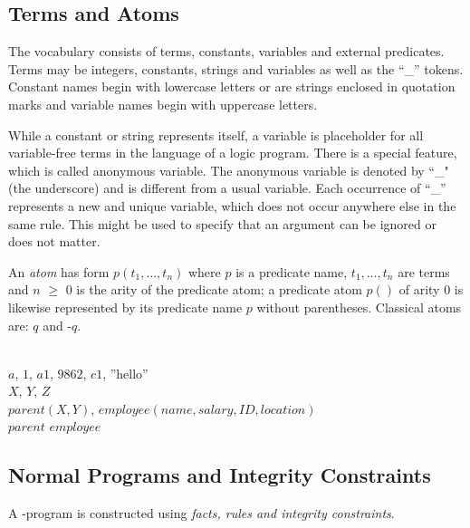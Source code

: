 \documentclass[a4paper, titlepage]{article}
\begin{document}
\subsection{Terms and Atoms}
The vocabulary consists of terms, constants, variables and 
external predicates. Terms may be integers, constants, 
strings and variables as well as the \enquote{\_} tokens. 
Constant names begin with lowercase letters or are strings 
enclosed in quotation marks and variable names begin with 
uppercase letters.

While a constant or string represents itself, a variable is 
placeholder for all variable-free terms in the language of 
a logic program. There is a special feature, which is 
called anonymous variable. The anonymous variable is 
denoted by ``\_" (the underscore) and is different from a 
usual variable. Each occurrence of \enquote{\_} represents 
a new and unique variable, which does not occur anywhere 
else in the same rule. This might be used to specify that 
an argument can be ignored or does not matter.

An \emph{atom} has form $\mathit{p(t_1,\dots,t_n)}$ where 
$p$ is a predicate name, $t_1,\dots,t_n$ are terms and $n$ 
$\geq$ $0$ is the arity of the predicate atom; a predicate 
atom $p()$ of arity 0 is likewise represented by its 
predicate name $p$ without parentheses. Classical atoms 
are: $q$ and -$q$.

\begin{exmp}
\text{   }
\\  $a$, $1$, $\mathit{a1}$, 
$\mathit{9862}$, $\mathit{c1}$, ''hello''
\\  $X$, $Y$, $Z$
\\  $\mathit{parent}(X,Y)$, $\mathit{employee}
(name, salary, ID, location)$
\\  $\mathit{parent}$ $\mathit{employee}$
\end{exmp}
\subsection{Normal Programs and Integrity Constraints}
A \hex{}-program is constructed using \emph{facts, rules 
and integrity constraints}. 
\end{document}
